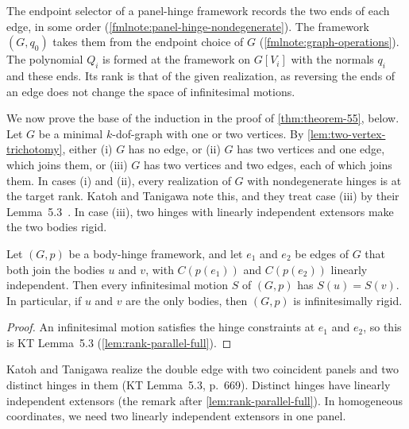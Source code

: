 \begin{fmlnote}
  The endpoint selector of a panel-hinge framework records the two ends
  of each edge, in some order
  (\cref{fmlnote:panel-hinge-nondegenerate}). The framework $(G, q_0)$
  takes them from the endpoint choice of $G$
  (\cref{fmlnote:graph-operations}). The polynomial $Q_i$ is formed at
  the framework on $G[V_i]$ with the normals $q_i$ and these ends. Its
  rank is that of the given realization, as reversing the ends of an
  edge does not change the space of infinitesimal motions.
\end{fmlnote}

We now prove the base of the induction in the proof of
\cref{thm:theorem-55}, below. Let $G$ be a minimal $k$-dof-graph with one or two
vertices. By \cref{lem:two-vertex-trichotomy}, either (i) $G$ has no edge,
or (ii) $G$ has two vertices and one edge, which joins them, or (iii) $G$
has two vertices and two edges, each of which joins them. In cases (i)
and (ii), every realization of $G$ with nondegenerate hinges is at the
target rank. Katoh and Tanigawa note this, and they treat case (iii) by
their Lemma~5.3~\cite[p.~671]{katohTanigawa2011}. In case (iii), two
hinges with linearly independent extensors make the two bodies rigid.

\begin{lemma}
  \label{lem:theorem-55-base}
  \leanok
  Let $(G,p)$ be a body-hinge framework, and let $e_1$ and $e_2$ be edges
  of $G$ that both join the bodies $u$ and $v$, with $C(p(e_1))$ and
  $C(p(e_2))$ linearly independent. Then every infinitesimal motion $S$
  of $(G,p)$ has $S(u) = S(v)$. In particular, if $u$ and $v$ are the
  only bodies, then $(G,p)$ is infinitesimally rigid.
\end{lemma}
\begin{proof}
  \leanok
  An infinitesimal motion satisfies the hinge constraints at $e_1$ and
  $e_2$, so this is KT Lemma~5.3 (\cref{lem:rank-parallel-full}).
\end{proof}

Katoh and Tanigawa realize the double edge with two coincident panels and
two distinct hinges in them (KT Lemma~5.3, p.~669). Distinct hinges have
linearly independent extensors (the remark after
\cref{lem:rank-parallel-full}). In homogeneous coordinates, we need two
linearly independent extensors in one panel.

